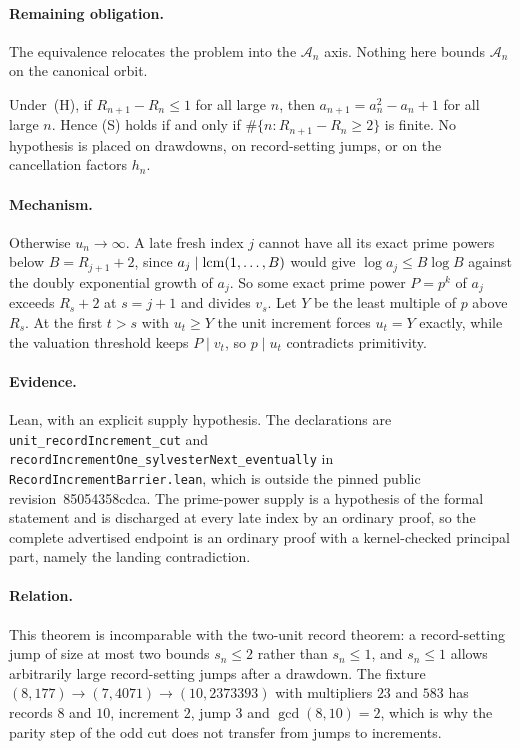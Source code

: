 \documentclass[11pt]{article}
\renewcommand{\commitshort}{85054358cdca}
\begin{document}
\paragraph{Remaining obligation.}
The equivalence relocates the problem into the $\mathcal A_n$ axis.  Nothing
here bounds $\mathcal A_n$ on the canonical orbit.

\begin{theorem}\label{long243:res:unitrecord}
Under~(H), if $R_{n+1}-R_n\le1$ for all large $n$, then $a_{n+1}=a_n^2-a_n+1$
for all large $n$.  Hence (S) holds if and only if
$\#\{n:R_{n+1}-R_n\ge2\}$ is finite.  No hypothesis is placed on drawdowns, on
record-setting jumps, or on the cancellation factors $h_n$.
\end{theorem}

\paragraph{Mechanism.}
Otherwise $u_n\to\infty$.  A late fresh index $j$ cannot have all its exact prime
powers below $B=R_{j+1}+2$, since $a_j\mid\operatorname{lcm}(1,\ldots,B)$ would give
$\log a_j\le B\log B$ against the doubly exponential growth of $a_j$.  So some
exact prime power $P=p^{k}$ of $a_j$ exceeds $R_s+2$ at $s=j+1$ and divides
$v_s$.  Let $Y$ be the least multiple of $p$ above $R_s$.  At the first $t>s$
with $u_t\ge Y$ the unit increment forces $u_t=Y$ exactly, while the valuation
threshold keeps $P\mid v_t$, so $p\mid u_t$ contradicts primitivity.

\paragraph{Evidence.}
Lean, with an explicit supply hypothesis.  The declarations are
\texttt{unit\_recordIncrement\_cut} and
\texttt{recordIncrementOne\_sylvesterNext\_eventually} in
\texttt{RecordIncrementBarrier.lean}, which is outside the pinned public
revision~\commitshort.  The prime-power supply is a hypothesis of the formal
statement and is discharged at every late index by an ordinary proof, so the
complete advertised endpoint is an ordinary proof with a kernel-checked
principal part, namely the landing contradiction.

\paragraph{Relation.}
This theorem is incomparable with the two-unit record theorem: a record-setting
jump of size at most two bounds $s_n\le2$ rather than $s_n\le1$, and $s_n\le1$
allows arbitrarily large record-setting jumps after a drawdown.  The fixture
$(8,177)\to(7,4071)\to(10,2373393)$ with multipliers $23$ and $583$ has records
$8$ and $10$, increment $2$, jump $3$ and $\gcd(8,10)=2$, which is why the
parity step of the odd cut does not transfer from jumps to increments.
\end{document}
